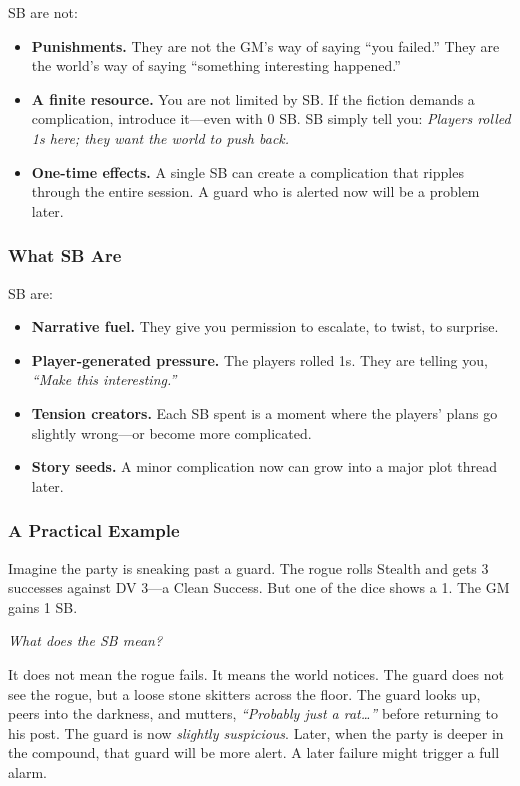 SB are not:
\begin{itemize}
  \item \textbf{Punishments.} They are not the GM's way of saying ``you failed.'' They are the world's way of saying ``something interesting happened.''
  \item \textbf{A finite resource.} You are not limited by SB. If the fiction demands a complication, introduce it---even with 0 SB. SB simply tell you: \textit{Players rolled 1s here; they want the world to push back.}
  \item \textbf{One-time effects.} A single SB can create a complication that ripples through the entire session. A guard who is alerted now will be a problem later.
\end{itemize}

\subsubsection{What SB Are}

SB are:
\begin{itemize}
  \item \textbf{Narrative fuel.} They give you permission to escalate, to twist, to surprise.
  \item \textbf{Player-generated pressure.} The players rolled 1s. They are telling you, \textit{``Make this interesting.''}
  \item \textbf{Tension creators.} Each SB spent is a moment where the players' plans go slightly wrong---or become more complicated.
  \item \textbf{Story seeds.} A minor complication now can grow into a major plot thread later.
\end{itemize}

\subsubsection{A Practical Example}

Imagine the party is sneaking past a guard. The rogue rolls Stealth and gets 3 successes against DV 3---a Clean Success. But one of the dice shows a 1. The GM gains 1 SB.

\textit{What does the SB mean?}

It does not mean the rogue fails. It means the world notices. The guard does not see the rogue, but a loose stone skitters across the floor. The guard looks up, peers into the darkness, and mutters, \textit{``Probably just a rat\dots''} before returning to his post. The guard is now \textit{slightly suspicious}. Later, when the party is deeper in the compound, that guard will be more alert. A later failure might trigger a full alarm.

